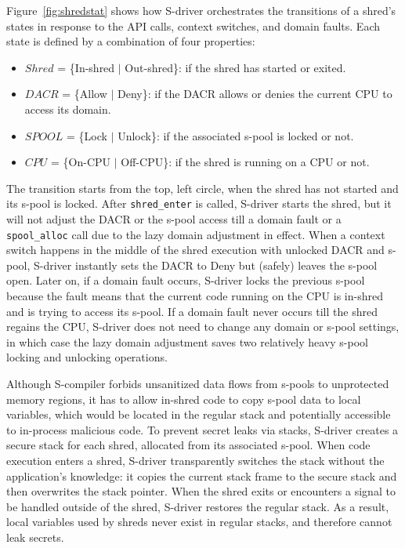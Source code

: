 
Figure~\ref{fig:shredstat} shows how S-driver orchestrates the transitions of a shred's states in response to the API calls, context switches, and domain faults. Each state is defined by a  combination of four properties:  

\begin{itemize}
\item $Shred$ = \{In-shred $|$ Out-shred\}: if the shred has started or exited. 
\item $DACR$ = \{Allow $|$ Deny\}: if the DACR allows or denies the current CPU to access its domain. 
\item $SPOOL$ = \{Lock $|$ Unlock\}: if the associated s-pool is locked or not. 
\item $CPU$ = \{On-CPU $|$ Off-CPU\}: if the shred is running on a CPU or not. 
\end{itemize}

The transition starts from the top, left circle, when the shred has not started and its s-pool is locked. After {\tt shred\_enter} is called, S-driver starts the shred, but it will not adjust the DACR or the s-pool access till a domain fault or a {\tt spool\_alloc} call due to the lazy domain adjustment in effect. When a context switch happens in the middle of the shred execution with unlocked DACR and s-pool, S-driver instantly sets the DACR to Deny but (safely) leaves the s-pool open. Later on, if a domain fault occurs, S-driver locks the previous s-pool because the fault means that the current code running on the CPU is in-shred and is trying to access its s-pool. If a domain fault never occurs till the shred regains the CPU, S-driver does not need to change any domain or s-pool settings, in which case the lazy domain adjustment saves two relatively heavy s-pool locking and unlocking operations. 
 
Although S-compiler forbids unsanitized data flows from s-pools to unprotected memory regions, it has to allow in-shred code to copy s-pool data to local variables, which would be located in the regular stack and potentially accessible to in-process malicious code. 
To prevent secret leaks via stacks, S-driver creates a secure stack for each shred, allocated from its associated s-pool. When code execution enters a shred, S-driver transparently switches the stack without the application's knowledge: it copies the current stack frame to the secure stack and then overwrites the stack pointer. When the shred exits or encounters a signal to be handled outside of the shred, S-driver restores the regular stack.
As a result, local variables used by shreds never exist in regular stacks, and therefore cannot leak secrets.

